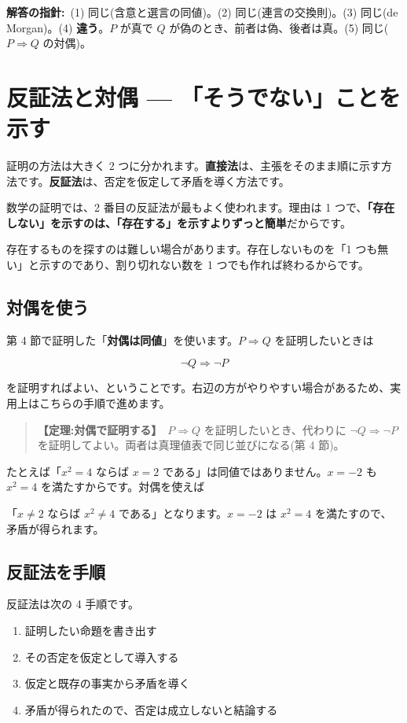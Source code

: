 \documentclass{article}
\begin{document}
\textbf{解答の指針:}\ (1) 同じ(含意と選言の同値)。(2) 同じ(連言の交換則)。(3) 同じ(de Morgan)。(4) \textbf{違う}。\(P\) が真で \(Q\) が偽のとき、前者は偽、後者は真。(5) 同じ(\(P \Rightarrow Q\) の対偶)。

\section{反証法と対偶 — 「そうでない」ことを示す}

証明の方法は大きく 2 つに分かれます。\textbf{直接法}は、主張をそのまま順に示す方法です。\textbf{反証法}は、否定を仮定して矛盾を導く方法です。

数学の証明では、2 番目の反証法が最もよく使われます。理由は 1 つで、\textbf{「存在しない」を示すのは、「存在する」を示すよりずっと簡単}だからです。

存在するものを探すのは難しい場合があります。存在しないものを「1 つも無い」と示すのであり、割り切れない数を 1 つでも作れば終わるからです。

\subsection{対偶を使う}

第 4 節で証明した「\textbf{対偶は同値}」を使います。\(P \Rightarrow Q\) を証明したいときは

\[ \neg Q \Rightarrow \neg P \]

を証明すればよい、ということです。右辺の方がやりやすい場合があるため、実用上はこちらの手順で進めます。

\begin{quote}
\textbf{【定理:対偶で証明する】}\ \(P \Rightarrow Q\) を証明したいとき、代わりに \(\neg Q \Rightarrow \neg P\) を証明してよい。両者は真理値表で同じ並びになる(第 4 節)。
\end{quote}

たとえば「\(x^2 = 4\) ならば \(x = 2\) である」は同値ではありません。\(x = -2\) も \(x^2 = 4\) を満たすからです。対偶を使えば

「\(x \neq 2\) ならば \(x^2 \neq 4\) である」となります。\(x = -2\) は \(x^2 = 4\) を満たすので、矛盾が得られます。

\subsection{反証法を手順}

反証法は次の 4 手順です。

\begin{enumerate}
\item 証明したい命題を書き出す
\item その否定を仮定として導入する
\item 仮定と既存の事実から矛盾を導く
\item 矛盾が得られたので、否定は成立しないと結論する
\end{enumerate}
\end{document}
